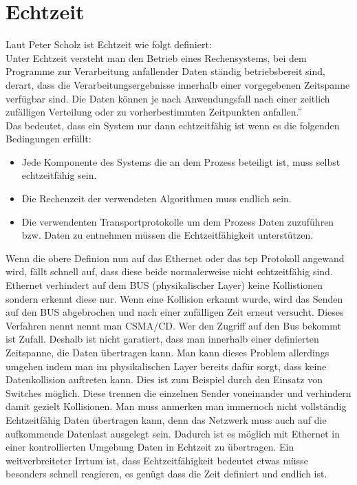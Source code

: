 \section{Echtzeit}
Laut Peter Scholz ist Echtzeit wie folgt definiert:\\
\glqq{}Unter Echtzeit versteht man den Betrieb
eines Rechensystems, bei dem Programme zur Verarbeitung
anfallender Daten ständig betriebsbereit sind, derart, dass die
Verarbeitungsergebnisse innerhalb einer vorgegebenen Zeitspanne
verfügbar sind. Die Daten können je nach Anwendungsfall nach
einer zeitlich zufälligen Verteilung oder zu vorherbestimmten
Zeitpunkten anfallen.''
\citep{Scholz:2005}\\
Das bedeutet, dass ein System nur dann echtzeitfähig ist wenn es die folgenden Bedingungen erfüllt:
\begin{itemize}
  \item Jede Komponente des Systems die an dem Prozess beteiligt ist, muss selbst echtzeitfähig sein.
  \item Die Rechenzeit der verwendeten Algorithmen muss endlich sein.
  \item Die verwendenten Transportprotokolle um dem Prozess Daten zuzuführen bzw. Daten zu entnehmen müssen die Echtzeitfähigkeit unterstützen.
\end{itemize}
Wenn die obere Definion nun auf das Ethernet oder das \ac{tcp} Protokoll angewand wird, fällt schnell auf, 
dass diese beide normalerweise nicht echtzeitfähig sind.
Ethernet verhindert auf dem BUS (physikalischer Layer) keine Kollistionen sondern erkennt diese nur. 
Wenn eine Kollision erkannt wurde, 
wird das Senden auf den BUS abgebrochen und nach einer zufälligen Zeit erneut versucht.
Dieses Verfahren nennt nennt man \ac{CSMA/CD}. 
Wer den Zugriff auf den Bus bekommt ist Zufall.
Deshalb ist nicht garatiert, dass man innerhalb einer definierten Zeitspanne, die Daten übertragen kann.
Man kann dieses Problem allerdings umgehen indem man im physikalischen Layer bereits dafür sorgt, 
dass keine Datenkollision auftreten kann. Dies ist zum Beispiel durch den Einsatz von Switches möglich.
Diese trennen die einzelnen Sender voneinander und verhindern damit gezielt Kollisionen.
Man muss anmerken man immernoch nicht vollständig Echtzeitfähig Daten übertragen kann, 
denn das Netzwerk muss auch auf die aufkommende Datenlast ausgelegt sein.
Dadurch ist es möglich mit Ethernet in einer kontrollierten Umgebung Daten in Echtzeit zu übertragen.
Ein weitverbreiteter Irrtum ist, dass Echtzeitfähigkeit bedeutet etwas müsse besonders schnell reagieren, 
es genügt dass die Zeit definiert und endlich ist.
